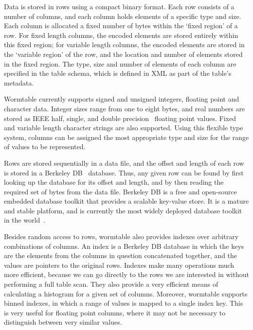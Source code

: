 \documentclass[10pt]{bmc_article}
\newenvironment{bmcformat}{\begin{raggedright}\baselineskip20pt\sloppy\setboolean{publ}{false}}{\end{raggedright}\baselineskip20pt\sloppy}
\begin{document}
\begin{bmcformat}
Data is stored in rows using a compact binary format.
Each row consists of a number of columns, and each column 
holds elements of a specific type and size.
Each column is allocated a fixed number of bytes within the `fixed region' of 
a row. For fixed
length columns, the encoded elements are stored entirely within this
fixed region; for variable length columns, the encoded elements are 
stored in the `variable region' of the row, and the location and number 
of elements stored in the fixed region. The type, size and number 
of elements of 
each column are specified in the table schema, which is defined 
in XML as part of the table's metadata.

Wormtable currently supports signed and unsigned integers, 
floating point and character data. Integer sizes range 
from one to eight bytes, and real numbers are stored as 
IEEE half, single, and double precision~\cite{ieee08}
floating point values.  
Fixed and variable length character strings 
are also supported. Using this flexible type system, columns can 
be assigned the most appropriate type and size for the range of
values to be represented.

Rows are stored sequentially in a data file, and the offset and length 
of each row is stored in a Berkeley DB~\cite{obs99} database. 
Thus, any given row can be found 
by first looking up the database for its offset and length, and by then reading
the required set of bytes from the data file. 
Berkeley DB is a free and open-source embedded database toolkit that provides a
scalable key-value store. It is a mature and stable platform, 
and is currently the most widely deployed database toolkit in the 
world~\cite{sb12}. 

Besides random access to rows, wormtable also provides indexes
over arbitrary combinations of columns. An index is a 
Berkeley DB database in 
which the keys are the elements from the columns in question concatenated
together, and the values are pointers to the original rows. Indexes make
many operations much more efficient, because we can go directly to the 
rows we are interested in without performing a full table scan. They also 
provide a very efficient means of calculating a histogram for a given 
set of columns. Moreover, wormtable supports binned indexes, in which a range of 
values is mapped to a single index key. This is very useful for floating 
point columns, where it may not be necessary to distinguish between
very similar values.


\end{bmcformat}
\end{document}
